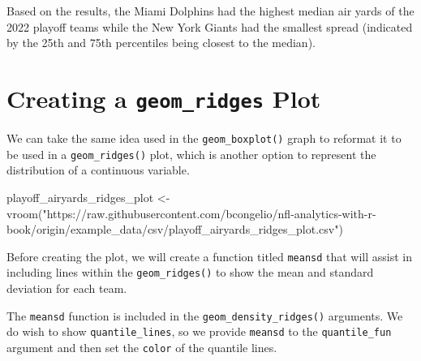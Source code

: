 \documentclass[
  letterpaper,
]{krantz}
\newenvironment{Shaded}{\begin{snugshade}}{\end{snugshade}}
\newcommand{\FunctionTok}[1]{\textcolor[rgb]{0.28,0.35,0.67}{#1}}
\newcommand{\NormalTok}[1]{\textcolor[rgb]{0.00,0.23,0.31}{#1}}
\newcommand{\OtherTok}[1]{\textcolor[rgb]{0.00,0.23,0.31}{#1}}
\newcommand{\StringTok}[1]{\textcolor[rgb]{0.13,0.47,0.30}{#1}}
\begin{document}
Based on the results, the Miami Dolphins had the highest median air
yards of the 2022 playoff teams while the New York Giants had the
smallest spread (indicated by the 25th and 75th percentiles being
closest to the median).

\hypertarget{creating-a-geom_ridges-plot}{%
\section{\texorpdfstring{Creating a \texttt{geom\_ridges}
Plot}{Creating a geom\_ridges Plot}}\label{creating-a-geom_ridges-plot}}

We can take the same idea used in the \texttt{geom\_boxplot()} graph to
reformat it to be used in a \texttt{geom\_ridges()} plot, which is
another option to represent the distribution of a continuous variable.

\begin{Shaded}
\begin{Highlighting}[]
\NormalTok{playoff\_airyards\_ridges\_plot }\OtherTok{\textless{}{-}}
  \FunctionTok{vroom}\NormalTok{(}\StringTok{"https://raw.githubusercontent.com/bcongelio/nfl{-}analytics{-}with{-}r{-}book/origin/example\_data/csv/playoff\_airyards\_ridges\_plot.csv"}\NormalTok{)}
\end{Highlighting}
\end{Shaded}

Before creating the plot, we will create a function titled
\texttt{meansd} that will assist in including lines within the
\texttt{geom\_ridges()} to show the mean and standard deviation for each
team.

The \texttt{meansd} function is included in the
\texttt{geom\_density\_ridges()} arguments. We do wish to show
\texttt{quantile\_lines}, so we provide \texttt{meansd} to the
\texttt{quantile\_fun} argument and then set the \texttt{color} of the
quantile lines.
\end{document}
